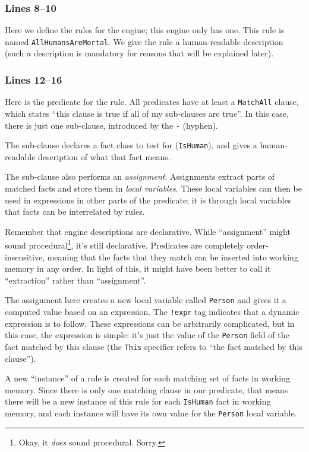 \documentclass[letterpaper,10pt]{article}
\begin{document}
\subsubsection*{Lines 8--10}
Here we define the rules for the engine; this engine only has one.
This rule is named \texttt{AllHumansAreMortal}.
We give the rule a human-readable description (such a description is mandatory for reasons that will be explained later).

\subsubsection*{Lines 12--16}
Here is the predicate for the rule.
All predicates have at least a \texttt{MatchAll} clause, which states ``this clause is true if all of my sub-clauses are true''.
In this case, there is just one sub-clause, introduced by the \texttt{-} (hyphen).

The sub-clause declares a fact class to test for (\texttt{IsHuman}), and gives a human-readable description of what that fact means.

The sub-clause also performs an \emph{assignment}.
Assignments extract parts of matched facts and store them in \emph{local variables}.
These local variables can then be used in expressions in other parts of the predicate; it is through local variables that facts can be interrelated by rules.

Remember that engine descriptions are declarative.
While ``assignment'' might sound procedural\footnote{Okay, it \emph{does} sound procedural.
Sorry.}, it's still declarative.
Predicates are completely order-insensitive, meaning that the facts that they match can be inserted into working memory in any order.
In light of this, it might have been better to call it ``extraction'' rather than ``assignment''.

The assignment here creates a new local variable called \texttt{Person} and gives it a computed value based on an expression.
The \texttt{!expr} tag indicates that a dynamic expression is to follow.
These expressions can be arbitrarily complicated, but in this case, the expression is simple: it's just the value of the \texttt{Person} field of the fact matched by this clause (the \texttt{This} specifier refers to ``the fact matched by this clause'').

A new ``instance'' of a rule is created for each matching set of facts in working memory.
Since there is only one matching clause in our predicate, that means there will be a new instance of this rule for each \texttt{IsHuman} fact in working memory, and each instance will have its own value for the \texttt{Person} local variable.
\end{document}
